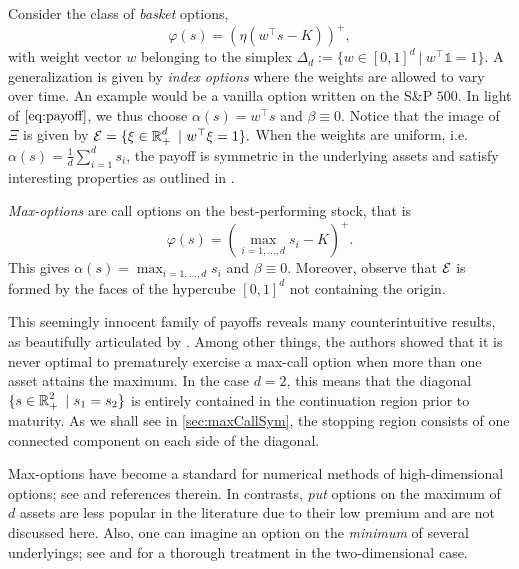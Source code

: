 \begin{example}\label{ex:bskt}
Consider the class of \textit{basket} options,
$$
\varphi(s)= \left( \eta \left( w^{\top} s - K \right) \right)^{+},
$$
with  weight vector $w$  belonging to the simplex $\Delta_{d} := \{w \in [0,1]^d \ | \ w^\top \mathds{1}=1\} $.
A generalization is given by \textit{index options} where the weights are allowed to vary over time. An example would be a vanilla option written on the S\&P $500$. 
In light of $\eqref{eq:payoff}$, we thus choose $\alpha(s) =  w^{\top} s$ and $\beta \equiv 0$.  
Notice that the image of  $\Xi$ is given by 
$\calE = \{ \xi \in \R_+^d \ | \ w^{\top} \xi =1 \}.$ 
When the weights are uniform, i.e. $\alpha(s) = \frac{1}{d}\sum_{i=1}^d s_i$, the payoff is symmetric in the underlying assets and satisfy interesting properties as outlined in . 

\end{example}

\begin{example}\label{ex:max}
\textit{Max-options} are call options  on the best-performing stock, that is
$$
\varphi(s)= \left(  \max_{i=1,...,d} s_i - K  \right)^{+}.
$$
This gives $\alpha(s)=\max_{i=1,...,d} s_i$ and $\beta\equiv 0$.  
Moreover, observe that 
$\operatorname{\mathcal{E}}$  is formed by the faces of the  hypercube $[0,1]^d $ not containing the origin. 

This seemingly innocent family of payoffs reveals many counterintuitive results, as beautifully articulated by \citet{BroadieDetemple}. Among other things, the authors showed that it is never optimal to prematurely exercise a max-call option when more than one asset attains the maximum. In the case $d=2$, this means that the diagonal $\{s \in \R^2_+ \ | \  s_1 = s_2\}$ is entirely contained in the continuation region prior to maturity. As we shall see in \cref{sec:maxCallSym},  the stopping region consists of one connected
component on each side of the diagonal. 

Max-options have become a standard for numerical methods of high-dimensional options; see \cite{Becker1,Becker2} and references therein.  
In contrasts, \textit{put} options on the maximum of $d$ assets are less popular in the literature due to their low premium and are not discussed here. 
Also, one can imagine an option on the \textit{minimum} of several underlyings; see \cite[Chapter 6]{DetempleBook} and \cite{DetempleMin} for a thorough treatment in the two-dimensional case. 
\end{example}


